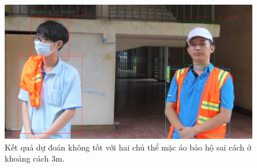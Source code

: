\begin{figure}[ht!]
	\centerline{\includegraphics[scale=0.18]{images/bad_sv_predict_4.jpg}}
  	\caption{Kết quả dự đoán không tốt với hai chủ thể mặc áo bảo hộ sai cách ở khoảng cách 3m.}
  	\label{fig:bad_sv_pred_3}
\end{figure}